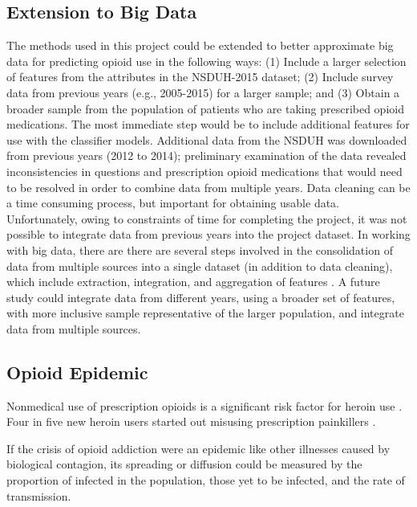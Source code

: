 \documentclass[sigconf]{acmart}
\begin{document}
\subsection{Extension to Big Data}

The methods used in this project could be extended to better approximate big 
data for predicting opioid use in the following ways: (1) Include a larger 
selection of features from the attributes in the NSDUH-2015 dataset; (2) 
Include survey data from previous years (e.g., 2005-2015) for a larger sample;  
and (3) Obtain a broader sample from the population of patients who are 
taking prescribed opioid medications. The most immediate step would be to 
include additional features for use with the classifier models. Additional 
data from the NSDUH was downloaded from previous years (2012 to 2014); 
preliminary examination of the data revealed inconsistencies in questions 
and prescription opioid medications that would need to be resolved in order 
to combine data from multiple years. Data cleaning can be a time consuming 
process, but important for obtaining usable data. Unfortunately, owing to 
constraints of time for completing the project, it was not possible to
integrate data from previous years into the project dataset. In working with
big data, there are there are several steps involved in the consolidation of 
data from multiple sources into a single dataset (in addition to data 
cleaning), which include extraction, integration, and aggregation of features  
\cite{rahm00}. A future study could integrate data from different years, 
using a broader set of features, with more inclusive sample representative
of the larger population, and integrate data from multiple sources. 

\subsection{Opioid Epidemic}

Nonmedical use of 
prescription opioids is a significant risk factor for heroin use \cite{Rudd16}.
Four in five new heroin users started out misusing prescription painkillers
\cite{jones13}.



If the crisis of opioid addiction were an epidemic like other illnesses caused 
by biological contagion, its spreading or diffusion could be measured by the 
proportion of infected in the population, those yet to be infected, and the 
rate of transmission. 
\end{document}
